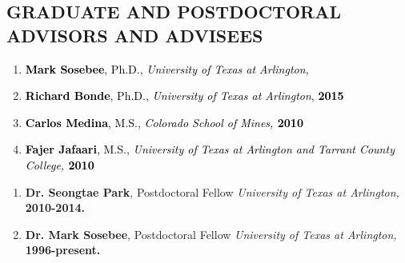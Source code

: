 \subsection[GRADUATE AND POSTDOCTORAL ADVISORS AND ADVISEES]{\color{black} GRADUATE AND POSTDOCTORAL ADVISORS AND
ADVISEES}

\begin{enumerate}
\item \textbf{\textcolor{black}{Mark }}\textbf{\textcolor{black}{Sosebee}}\textcolor{black}{, Ph.D.,
}\textit{\textcolor{black}{University of Texas at Arlington,}}

\item \textbf{\textcolor{black}{Richard Bonde}}\textcolor{black}{, Ph.D., }\textit{\textcolor{black}{University of
Texas at Arlington}}\textcolor{black}{, }\textbf{\textcolor{black}{2015}}

\item \textbf{\textcolor{black}{Carlos Medina}}\textcolor{black}{, M.S., }\textit{\textcolor{black}{Colorado School of 
Mines,}}\textbf{\textcolor{black}{ 2010}}

\item \textbf{\textcolor{black}{Fajer Jafaari}}\textcolor{black}{, M.S., }\textit{\textcolor{black}{University of Texas 
at Arlington and Tarrant County College,}}\textbf{\textcolor{black}{ 2010}}

\end{enumerate}

\begin{enumerate}

\item {
\textbf{Dr. Seongtae Park}, Postdoctoral Fellow\newline
\textit{University of Texas at Arlington, }\textbf{2010-2014.}}

\item {
\textbf{Dr. Mark Sosebee}, Postdoctoral Fellow\newline
\textit{University of Texas at Arlington, }\textbf{1996-present.}}

\end{enumerate}

